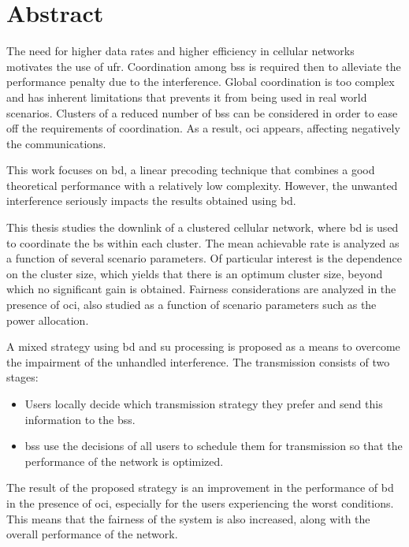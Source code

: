 \chapter*{Abstract}

The need for higher data rates and higher efficiency in cellular networks
motivates the use of \gls{ufr}. Coordination among \glspl{bs} is required then
to alleviate the performance penalty due to the interference. Global
coordination is too complex and has inherent limitations that prevents it from
being used in real world scenarios. Clusters of a reduced number of \glspl{bs}
can be considered in order to ease off the requirements of coordination. As a
result, \gls{oci} appears, affecting negatively the communications.

This work focuses on \gls{bd}, a linear precoding technique that combines a
good theoretical performance with a relatively low complexity. However, the
unwanted interference seriously impacts the results obtained using \gls{bd}.

This thesis studies the downlink of a clustered cellular network, where \gls{bd}
is used to coordinate the \gls{bs} within each cluster. The mean achievable rate
is analyzed as a function of several scenario parameters. Of particular interest
is the dependence on the cluster size, which yields that there is an optimum
cluster size, beyond which no significant gain is obtained. Fairness
considerations are analyzed in the presence of \gls{oci}, also studied as a
function of scenario parameters such as the power allocation.

A mixed strategy using \gls{bd} and \gls{su} processing is proposed as a means
to overcome the impairment of the unhandled interference. The transmission
consists of two stages:

\begin{itemize}
    \item Users locally decide which transmission strategy they prefer and send
        this information to the \glspl{bs}.
    \item \glspl{bs} use the decisions of all users to schedule them for
        transmission so that the performance of the network is optimized.
\end{itemize}

The result of the proposed strategy is an improvement in the performance of
\gls{bd} in the presence of \gls{oci}, especially for the users experiencing the
worst conditions. This means that the fairness of the system is also increased,
along with the overall performance of the network.
